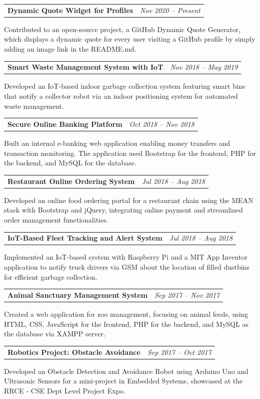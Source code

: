 \documentclass[letterpaper,10pt]{article}
\makeatletter
\newcommand{\projectEntry}[3]{
  \vspace{2pt}
  \noindent
  \begin{tabular*}{\textwidth}{@{\extracolsep{\fill}}lr}
    \textbf{#1} & \textit{#2} \\
  \end{tabular*}\vspace{-2pt}
  \noindent
  \parbox[t]{0.97\textwidth}{\footnotesize #3}
  \vspace{8pt}
}
\makeatother
\begin{document}
\projectEntry
  {Dynamic Quote Widget for Profiles}
  {Nov 2020 -- Present}
  {Contributed to an open-source project, a GitHub Dynamic Quote Generator, which displays a dynamic quote for every user visiting a GitHub profile by simply adding an image link in the README.md.}

\projectEntry
  {Smart Waste Management System with IoT}
  {Nov 2018 -- May 2019}
  {Developed an IoT-based indoor garbage collection system featuring smart bins that notify a collector robot via an indoor positioning system for automated waste management.}

\projectEntry
  {Secure Online Banking Platform}
  {Oct 2018 -- Nov 2018}
  {Built an internal e-banking web application enabling money transfers and transaction monitoring. The application used Bootstrap for the frontend, PHP for the backend, and MySQL for the database.}

\projectEntry
  {Restaurant Online Ordering System}
  {Jul 2018 -- Aug 2018}
  {Developed an online food ordering portal for a restaurant chain using the MEAN stack with Bootstrap and jQuery, integrating online payment and streamlined order management functionalities.}

\projectEntry
  {IoT-Based Fleet Tracking and Alert System}
  {Jul 2018 -- Aug 2018}
  {Implemented an IoT-based system with Raspberry Pi and a MIT App Inventor application to notify truck drivers via GSM about the location of filled dustbins for efficient garbage collection.}

\projectEntry
  {Animal Sanctuary Management System}
  {Sep 2017 -- Nov 2017}
  {Created a web application for zoo management, focusing on animal feeds, using HTML, CSS, JavaScript for the frontend, PHP for the backend, and MySQL as the database via XAMPP server.}

\projectEntry
  {Robotics Project: Obstacle Avoidance}
  {Sep 2017 -- Oct 2017}
  {Developed an Obstacle Detection and Avoidance Robot using Arduino Uno and Ultrasonic Sensors for a mini-project in Embedded Systems, showcased at the RRCE - CSE Dept Level Project Expo.}

\end{document}
